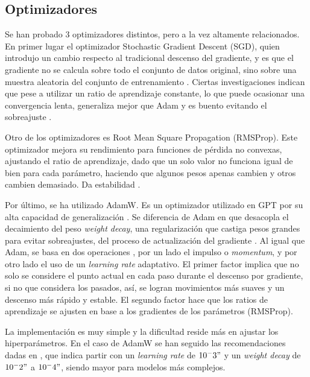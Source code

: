 \documentclass[11pt]{book}
\theoremstyle{plain}
\theoremstyle{definition}
\begin{document}
\subsection{Optimizadores}

Se han probado 3 optimizadores distintos, pero a la vez altamente relacionados. En primer lugar el optimizador Stochastic Gradient Descent (SGD), quien introdujo un cambio respecto al tradicional descenso del gradiente, y es que el gradiente no se calcula sobre todo el conjunto de datos original, sino sobre una muestra aleatoria del conjunto de entrenamiento \parencite{geeksforgeeks_sgd}. Ciertas investigaciones indican que pese a utilizar un ratio de aprendizaje constante, lo que puede ocasionar una convergencia lenta, generaliza mejor que Adam y es buento evitando el sobreajuste \parencite{ultralytics_adam_glossary}. 

Otro de los optimizadores es Root Mean Square Propagation (RMSProp). Este optimizador mejora su rendimiento para funciones de pérdida no convexas, ajustando el ratio de aprendizaje, dado que un solo valor no funciona igual de bien para cada parámetro, haciendo que algunos pesos apenas cambien y otros cambien demasiado. Da estabilidad \parencite{kashyap2024rmsprop}.

Por último, se ha utilizado AdamW. Es un optimizador utilizado en GPT por su alta capacidad de generalización . Se diferencia de Adam en que desacopla el decaimiento del peso \textit{weight decay}, una regularización que castiga pesos grandes para evitar sobreajustes, del proceso de actualización del gradiente \parencite{datacamp_adamw_pytorch}.  Al igual que Adam, se basa en dos operaciones \parencite{yassin2024adamvsadamw}, por un lado el impulso o \textit{momentum}, y por otro lado el uso de un \textit{learning rate} adaptativo. El primer factor implica que no solo se considere el punto actual en cada paso durante el descenso por gradiente, si no que considera los pasados, así, se logran movimientos más suaves y un descenso más rápido y estable. El segundo factor hace que los ratios de aprendizaje se ajusten en base a los gradientes de los parámetros (RMSProp).

La implementación es muy simple y la dificultad reside más en ajustar los hiperparámetros. En el caso de AdamW se han seguido las recomendaciones dadas en \parencite{datacamp_adamw_pytorch}, que indica partir con un \textit{learning rate} de $10^-3"$ y un \textit{weight decay} de $10^-2"$ a $10^-4"$, siendo mayor para modelos más complejos. 
\end{document}

